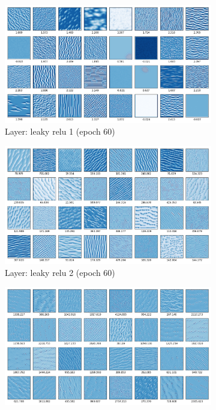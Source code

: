 \documentclass[12pt,a4paper]{extarticle}
\begin{document}
\begin{enumerate}
  \begin{figure}[H]
    \begin{subfigure}[t]{0.5\textwidth}
      \centering
      \includegraphics[width=\linewidth]{images/leaky_re_lu_1_e60.png}
      \caption{Layer: leaky relu 1 (epoch 60)}
      \label{fig:leaky_relu_1_e60}
    \end{subfigure}
    \begin{subfigure}[t]{0.5\textwidth}
      \centering
      \includegraphics[width=\linewidth]{images/leaky_re_lu_2_e60.png}
      \caption{Layer: leaky relu 2 (epoch 60)}
      \label{fig:leaky_relu_2_e60}
    \end{subfigure}
    \begin{subfigure}[t]{0.5\textwidth}
      \centering
      \includegraphics[width=\linewidth]{images/leaky_re_lu_3_e60.png}

\end{subfigure}
\end{figure}
\end{enumerate}
\end{document}
